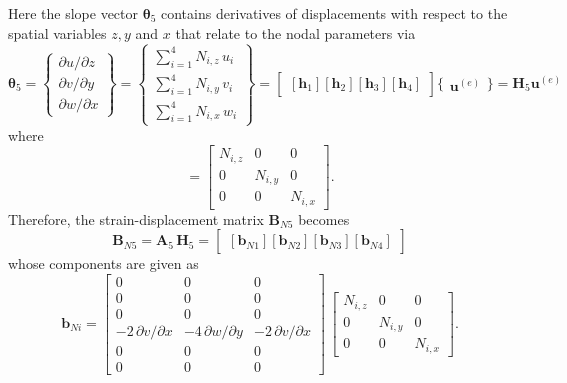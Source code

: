 Here the slope vector $\boldsymbol{\theta}_5$ contains derivatives of displacements with respect to the spatial variables $z, y$ and $x$ that relate to the nodal parameters via
\begin{equation}
	\boldsymbol{\theta}_5 =  \begin{Bmatrix}
		\partial u / \partial z\\
		\partial v / \partial y \\
		\partial w / \partial x
	\end{Bmatrix}
	= \begin{Bmatrix}
		\sum\nolimits_{i=1}^4 N_{i,z} \, u_i\\
		\sum\nolimits_{i=1}^4 N_{i,y} \, v_i \\
		\sum\nolimits_{i=1}^4 N_{i,x} \, w_i
	\end{Bmatrix} 
	= \begin{bmatrix}
		[\mathbf{h}_1] [\mathbf{h}_2] [\mathbf{h}_3] [\mathbf{h}_4] 
	\end{bmatrix} \bigl\{ \begin{matrix} \mathbf{u}^{(e)} \end{matrix} \bigr\}
	= \mathbf{H}_5  \mathbf{u}^{(e)}
\end{equation}
where 
\begin{equation}
	[\mathbf{h}_i] = \begin{bmatrix}
		N_{i,z} &  0 & 0  \\
		0 & N_{i,y} & 0  \\
		0 & 0 & N_{i,x} \end{bmatrix}. 
\end{equation}
Therefore, the strain-displacement matrix $\mathbf{B}_{N5}$ becomes
\begin{equation}
	\mathbf{B}_{N5} = \mathbf{A}_5 \, \mathbf{H}_5 = \begin{bmatrix}
		[\mathbf{b}_{N1}] [\mathbf{b}_{N2}] [\mathbf{b}_{N3}] [\mathbf{b}_{N4}]
	\end{bmatrix} 
\end{equation}
whose components are given as
\begin{equation}
	\mathbf{b}_{Ni} = \begin{bmatrix}
		0 & 0 &  0   \\
		0 &  0 & 0  \\
		0 &  0 & 0 \\
		- 2 \, \partial v / \partial x & - 4 \, \partial w / \partial y & - 2 \, \partial v / \partial x  \\
		0 &  0 & 0  \\
		0 &  0 & 0  \end{bmatrix} \, \begin{bmatrix}
		N_{i,z} &  0 & 0  \\
		0 & N_{i,y} & 0  \\
		0 & 0 & N_{i,x}  \end{bmatrix}.
\end{equation}

